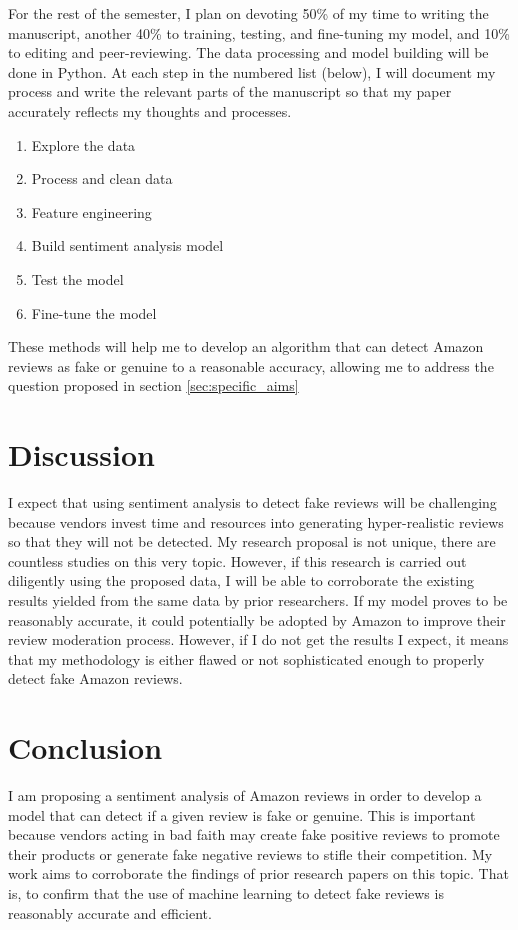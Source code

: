 \documentclass[12pt, letterpaper, titlepage]{article}
\begin{document}
For the rest of the semester, I plan on devoting 50\% of my time to writing the manuscript, another 40\% to training, testing, and fine-tuning my model, and 10\% to editing and peer-reviewing. The data processing and model building will be done in Python. At each step in the numbered list (below), I will document my process and write the relevant parts of the manuscript so that my paper accurately reflects my thoughts and processes.

\begin{enumerate}
  \item Explore the data
  \item Process and clean data
  \item Feature engineering
  \item Build sentiment analysis model
  \item Test the model
  \item Fine-tune the model
\end{enumerate}

These methods will help me to develop an algorithm that can detect Amazon reviews as fake or genuine to a reasonable accuracy, allowing me to address the question proposed in section \ref{sec:specific_aims}

\section{Discussion}
\label{sec:discussion}

I expect that using sentiment analysis to detect fake reviews will be challenging because vendors invest time and resources into generating hyper-realistic reviews so that they will not be detected. My research proposal is not unique, there are countless studies on this very topic. However, if this research is carried out diligently using the proposed data, I will be able to corroborate the existing results yielded from the same data by prior researchers. If my model proves to be reasonably accurate, it could potentially be adopted by Amazon to improve their review moderation process. However, if I do not get the results I expect, it means that my methodology is either flawed or not sophisticated enough to properly detect fake Amazon reviews.

\section{Conclusion}
\label{sec:conclusion}

I am proposing a sentiment analysis of Amazon reviews in order to develop a model that can detect if a given review is fake or genuine. This is important because vendors acting in bad faith may create fake positive reviews to promote their products or generate fake negative reviews to stifle their competition. My work aims to corroborate the findings of prior research papers on this topic. That is, to confirm that the use of machine learning to detect fake reviews is reasonably accurate and efficient.



\end{document}
